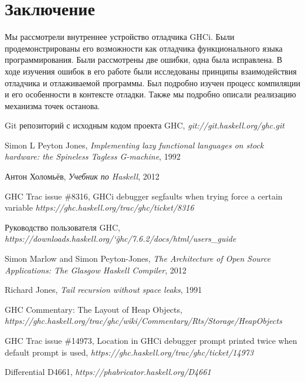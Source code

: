 \documentclass[fontsize=14pt, paper=a4, pagesize, DIV=calc]{scrartcl}
\begin{document}
\section{Заключение}

Мы рассмотрели внутреннее устройство отладчика GHCi. Были продемонстрированы
его возможности как отладчика функционального языка программирования. Были
рассмотрены две ошибки, одна была исправлена. В ходе изучения ошибок в его
работе были исследованы принципы взаимодействия отладчика и отлаживаемой
программы. Был подробно изучен процесс компиляции и его особенности в контексте
отладки. Также мы подробно описали реализацию механизма точек останова. 

\begin{thebibliography}{9}

Git репозиторий с исходным кодом проекта GHC,
\emph{git://git.haskell.org/ghc.git}

Simon L Peyton Jones,
\emph{Implementing lazy functional languages on stock hardware: the Spineless
Tagless G-machine}, 1992

Антон Холомьёв,
\emph{Учебник по Haskell}, 2012

GHC Trac issue \#8316,
GHCi debugger segfaults when trying force a certain variable
\emph{https://ghc.haskell.org/trac/ghc/ticket/8316}

Руководство пользователя GHC,\\
\emph{https://downloads.haskell.org/\char`\~ghc/7.6.2/docs/html/users\_guide}

Simon Marlow and Simon Peyton-Jones,
\emph{The Architecture of Open Source Applications: The Glasgow Haskell Compiler},
2012

Richard Jones,
\emph{Tail recursion without space leaks},
1991

GHC Commentary: The Layout of Heap Objects,
\emph{https://ghc.haskell.org/trac/ghc/wiki/Commentary/Rts/Storage/HeapObjects}

GHC Trac issue \#14973,
Location in GHCi debugger prompt printed twice when default prompt is used,
\emph{https://ghc.haskell.org/trac/ghc/ticket/14973}

Differential D4661,
\emph{https://phabricator.haskell.org/D4661}

\end{thebibliography}
\end{document}
